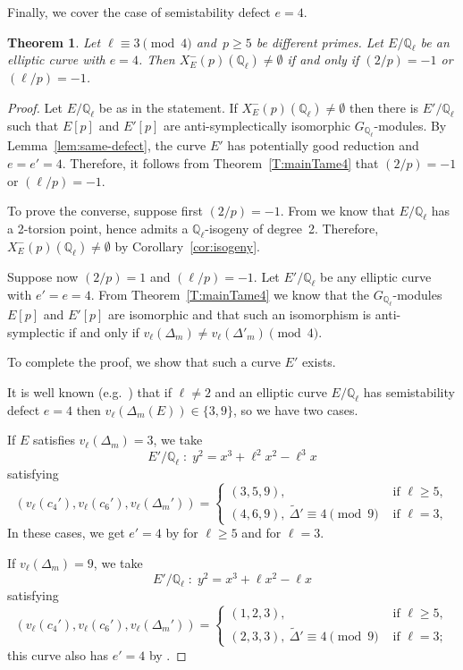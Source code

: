 \documentclass[12pt]{amsart}
\numberwithin{equation}{section}
\newtheorem{theorem}[equation]{Theorem}
\theoremstyle{definition}
\newcommand{\Q}{\mathbb{Q}}
\newcommand{\Xp}{X_E^{-}(p)}
\begin{document}
Finally, we cover the case of semistability defect $e=4$.

\begin{theorem}\label{thm:e4l}
	Let $\ell \equiv 3 \pmod{4}$ and~$p \geq 5$ be different primes.
	Let $E/\Q_\ell$ be an elliptic curve with $e=4$.
	Then $\Xp(\Q_\ell)\neq \emptyset$ if and only if $(2/p)= -1$ or $(\ell / p) = -1$.
\end{theorem}

\begin{proof}
Let $E/\Q_\ell$ be as in the statement. 
If $\Xp(\Q_\ell)\neq \emptyset$ then there is $E'/\Q_\ell$ such that
$E[p]$ and $E'[p]$ are anti-symplectically isomorphic $G_{\Q_\ell}$-modules. 
By Lemma~\ref{lem:same-defect}, the curve $E'$ has potentially good
reduction and $e=e'=4$.
Therefore, it follows from Theorem~\ref{T:mainTame4} that $(2/p)= -1$ or $(\ell / p) = -1$.

To prove the converse, suppose first $(2/p)= -1$.
From \cite[Lemma 19 (i)]{symplectic} we know that $E/\Q_\ell$ has a 2-torsion point, hence admits a $\Q_\ell$-isogeny of degree~2. Therefore, $\Xp(\Q_\ell)\neq \emptyset$ by Corollary~\ref{cor:isogeny}.

Suppose now $(2/p) = 1$ and $(\ell /p)= -1$.
Let $E'/\Q_\ell$ be any elliptic curve with $e'=e=4$. 
From Theorem~\ref{T:mainTame4}
we know that the $G_{\Q_\ell}$-modules $E[p]$ and $E'[p]$ are isomorphic and that such an isomorphism is
anti-symplectic if and only if $v_{\ell}(\Delta_m)\neq v_{\ell}(\Delta'_m)\pmod 4$.

To complete the proof, we show that such a curve $E'$ exists.

It is well known (e.g.~\cite[Table 5]{symplectic}) that if $\ell \neq 2$ and an elliptic curve $E/\Q_\ell$ has semistability defect $e=4$ then $v_\ell(\Delta_m(E))\in \{3,9\}$, so we have two cases. 

If
$E$ satisfies $v_\ell(\Delta_m)=3$, we take
\[
E'  / \Q_{\ell} \; : \;  y^2=x^3+\ell^2x^2-\ell^3x
\]
satisfying
\[
(v_{\ell}(c_4'), v_{\ell}(c_6'), v_{\ell}(\Delta_m'))=
\begin{cases}
(3,5,9), & \text{ if }\ell \geq 5,\\
(4,6,9),\: \tilde{\Delta}' \equiv 4 \pmod 9 & \text{ if }\ell=3,
\end{cases}
\]
In these cases, we get $e'=4$ by \cite[Proposition 1]{Kraus} for $\ell \geq 5$ and \cite[p. 356]{Kraus} for $\ell=3$.

If $v_\ell(\Delta_m)=9$, we take
\[
E' / \Q_{\ell} \; : \; y^2=x^3+\ell x^2-\ell x
\]
satisfying
\[
(v_{\ell}(c_4'), v_{\ell}(c_6'), v_{\ell}(\Delta_{m}'))=
\begin{cases}
    (1, 2, 3), & \text{ if }\ell\geq 5,\\

(2,3,3),\: \tilde{\Delta}'\equiv 4 \pmod 9 & \text{ if }\ell=3;
\end{cases}
\]
this curve also has $e'=4$
by \cite[Proposition 1, and p. 356]{Kraus}.

\end{proof}
\end{document}

